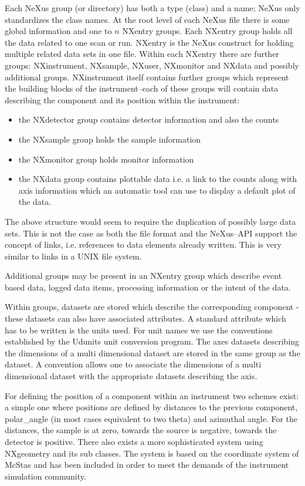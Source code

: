 Each NeXus group (or directory) has both a type (class) and a
name; NeXus only standardizes the class names. At the root level of
each NeXus file there is some global information and one to $n$ NXentry
groups. Each NXentry group holds all the data related to one scan or
run. NXentry is the NeXus construct for holding multiple related data sets in one
file. Within each NXentry there are further groups: NXinstrument,
NXsample, NXuser, NXmonitor and NXdata and possibly additional
groups. NXinstrument itself contains further groups which represent the
building blocks of the instrument--each of these groups will contain data
describing the component and its position within the instrument:
\begin{itemize} 
\item the NXdetector group contains detector information and also the counts 
\item the NXsample group holds the sample information
\item the NXmonitor group holds monitor information
\item the NXdata group contains plottable data i.e. a link to the counts along 
   with axis information which an automatic tool can use
to display a default plot of the data. 
\end{itemize} 

The above structure would seem to require
the duplication of possibly large data sets. This is not the case as
both the file format and the NeXus--API support the concept of links,
i.e. references to data elements already written. This is very similar to
links in a UNIX file system. 

Additional groups may be present in an NXentry group which describe
event based data, logged data items, processing information or the 
intent of the data.

Within groups, datasets are stored which describe the
corresponding component - these datasets can also have associated attributes. 
A standard attribute which has to be written is the units used. 
For unit names we
use the conventions established by the Udunits\cite{udu} unit
conversion program. The axes datasets describing the dimensions of a 
 multi dimensional dataset are stored in the same group as the
 dataset. A convention allows one to associate the dimensions of a multi 
 dimensional dataset with the appropriate datasets describing the axis. 

For defining the position of a component within an instrument two
schemes exist: a simple one where positions are defined by distances
to the previous component, polar\_angle (in most cases equivalent to
two theta) and azimuthal angle. For the distances, the sample is at zero,
towards the source is negative, towards the detector is
positive. There also exists a more sophisticated system using
NXgeometry and its sub classes. The system is based on the coordinate
system of McStas\cite{mcstas} and has been included in order to meet 
the demands of the instrument simulation community.  

